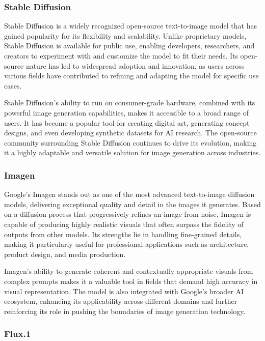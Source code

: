 \subsubsection{Stable Diffusion}

Stable Diffusion \cite{StableDiffusion} is a widely recognized open-source text-to-image model that has gained popularity for its flexibility and scalability. Unlike proprietary models, Stable Diffusion is available for public use, enabling developers, researchers, and creators to experiment with and customize the model to fit their needs. Its open-source nature has led to widespread adoption and innovation, as users across various fields have contributed to refining and adapting the model for specific use cases.

Stable Diffusion's ability to run on consumer-grade hardware, combined with its powerful image generation capabilities, makes it accessible to a broad range of users. It has become a popular tool for creating digital art, generating concept designs, and even developing synthetic datasets for AI research. The open-source community surrounding Stable Diffusion continues to drive its evolution, making it a highly adaptable and versatile solution for image generation across industries.

\subsubsection{Imagen}

Google's Imagen \cite{Imagen} stands out as one of the most advanced text-to-image diffusion models, delivering exceptional quality and detail in the images it generates. Based on a diffusion process that progressively refines an image from noise, Imagen is capable of producing highly realistic visuals that often surpass the fidelity of outputs from other models. Its strengths lie in handling fine-grained details, making it particularly useful for professional applications such as architecture, product design, and media production.

Imagen's ability to generate coherent and contextually appropriate visuals from complex prompts makes it a valuable tool in fields that demand high accuracy in visual representation. The model is also integrated with Google's broader AI ecosystem, enhancing its applicability across different domains and further reinforcing its role in pushing the boundaries of image generation technology.

\subsubsection{Flux.1}

